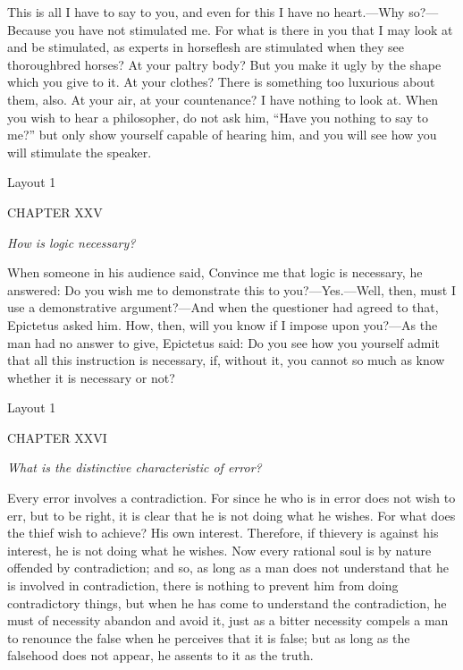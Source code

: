 This is all I have to say to you, and even for this I have no heart.—Why so?—Because you have not stimulated me. For what is there in you that I may look at and be stimulated, as experts in horseflesh are stimulated when they see thoroughbred horses? At your paltry body? But you make it ugly by the shape which you give to it. At your clothes? There is something too luxurious about them, also. At your air, at your countenance? I have nothing to look at. When you wish to hear a philosopher, do not ask him, ``Have you nothing to say to me?'' but only show yourself capable of hearing him, and you will see how you will stimulate the speaker.



Layout 1

CHAPTER XXV

\emph{How is logic necessary?}

When someone in his audience said, Convince me that logic is necessary, he answered: Do you wish me to demonstrate this to you?—Yes.—Well, then, must I use a demonstrative argument?—And when the questioner had agreed to that, Epictetus asked him. How, then, will you know if I impose upon you?—As the man had no answer to give, Epictetus said: Do you see how you yourself admit that all this instruction is necessary, if, without it, you cannot so much as know whether it is necessary or not?


Layout 1

CHAPTER XXVI

\emph{What is the distinctive characteristic of error?}

Every error involves a contradiction. For since he who is in error does not wish to err, but to be right, it is clear that he is not doing what he wishes. For what does the thief wish to achieve? His own interest. Therefore, if thievery is against his interest, he is not doing what he wishes. Now every rational soul is by nature offended by contradiction; and so, as long as a man does not understand that he is involved in contradiction, there is nothing to prevent him from doing contradictory things, but when he has come to understand the contradiction, he must of necessity abandon and avoid it, just as a bitter necessity compels a man to renounce the false when he perceives that it is false; but as long as the falsehood does not appear, he assents to it as the truth.

